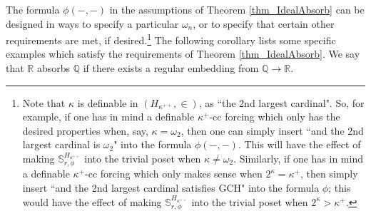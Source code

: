 \documentclass{amsart}
\begin{document}
The formula $\phi(-,-)$ in the assumptions of Theorem \ref{thm_IdealAbsorb} can be designed in ways to specify a particular $\omega_n$, or to specify that certain other requirements are met, if desired.\footnote{Note that $\kappa$ is definable in $(H_{\kappa^{++}}, \in)$, as ``the 2nd largest cardinal".  So, for example, if one has in mind a definable $\kappa^+$-cc forcing which only has the desired properties when, say, $\kappa = \omega_2$, then one can simply insert ``and the 2nd largest cardinal is $\omega_2$" into the formula $\phi(-,-)$.  This will have the effect of making $\mathbb{S}^{H_{\kappa^{++}}}_{r,\phi}$ into the trivial poset when $\kappa \ne \omega_2$.  Similarly, if one has in mind a definable $\kappa^+$-cc forcing which only makes sense when $2^\kappa= \kappa^+$, then simply insert ``and the 2nd largest cardinal satisfies GCH" into the formula $\phi$; this would have the effect of making $\mathbb{S}^{H_{\kappa^{++}}}_{r,\phi}$ into the trivial poset when $2^\kappa > \kappa^+$. }  The following corollary lists some specific examples which satisfy the requirements of Theorem \ref{thm_IdealAbsorb}.  We say that $\mathbb{R}$ absorbs $\mathbb{Q}$ if there exists a regular embedding from $\mathbb{Q} \to \mathbb{R}$.  
\end{document}
